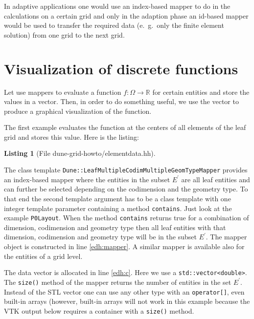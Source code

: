 \documentclass[11pt,a4paper,headinclude,footinclude,DIV16,normalheadings]{scrreprt}
\newtheorem{lst}{Listing}
\begin{document}
In adaptive applications one would use an index-based mapper to do in
the calculations on a certain grid and only in the adaption phase an
id-based mapper would be used to transfer the required data
(e.~g.~only the finite element solution) from one grid to the next grid.

\section{Visualization of discrete functions}

Let use mappers to evaluate a function $f:\Omega\to\mathbb{R}$ for
certain entities and store the values in a vector. Then, in order to
do something useful, we use the vector to produce a graphical
visualization of the function.

The first example evaluates the function at the centers of all
elements of the leaf grid and stores this value. Here is the listing:

\begin{lst}[File dune-grid-howto/elementdata.hh] \mbox{}
\nopagebreak

\end{lst}

The class template
\lstinline!Dune::LeafMultipleCodimMultipleGeomTypeMapper!  provides an
index-based mapper where the entities in the subset $E^\prime$ are all
leaf entities and can further be selected depending on the codimension
and the geometry type. To that end the second template argument has to
be a class template with one integer template parameter containing a
method \lstinline!contains!. Just look at the example
\lstinline!P0Layout!. When the method \lstinline!contains!  returns
true for a combination of dimension, codimension and geometry type
then all leaf entities with that dimension, codimension and geometry
type will be in the subset $E^\prime$. The mapper object is
constructed in line \ref{edh:mapper}. A similar mapper is available
also for the entities of a grid level.

The data vector is allocated in line \ref{edh:c}. Here we use a
\lstinline!std::vector<double>!. The \lstinline!size()! method of the
mapper returns the number of entities in the set $E^\prime$. Instead
of the STL vector one can use any other type with an
\lstinline!operator[]!, even built-in arrays (however, built-in arrays
will not work in this example because the VTK output
below requires a container with a
\lstinline!size()! method. 
\end{document}
